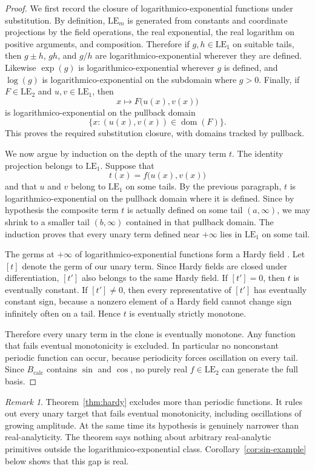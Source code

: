 \documentclass[11pt]{amsart}
\numberwithin{equation}{section}
\theoremstyle{remark}
\newtheorem{remark}[theorem]{Remark}
\theoremstyle{definition}
\newcommand{\LE}{\mathrm{LE}}
\newcommand{\calc}{B_{\mathrm{calc}}}
\begin{document}
\begin{proof}
We first record the closure of logarithmico-exponential functions under substitution. By definition, $\LE_m$ is generated from constants and coordinate projections by the field operations, the real exponential, the real logarithm on positive arguments, and composition. Therefore if $g,h\in \LE_1$ on suitable tails, then $g\pm h$, $gh$, and $g/h$ are logarithmico-exponential wherever they are defined. Likewise $\exp(g)$ is logarithmico-exponential wherever $g$ is defined, and $\log(g)$ is logarithmico-exponential on the subdomain where $g>0$. Finally, if $F\in \LE_2$ and $u,v\in \LE_1$, then
\[
x\longmapsto F\bigl(u(x),v(x)\bigr)
\]
is logarithmico-exponential on the pullback domain
\[
\{x:(u(x),v(x))\in \operatorname{dom}(F)\}.
\]
This proves the required substitution closure, with domains tracked by pullback.

We now argue by induction on the depth of the unary term $t$. The identity projection belongs to $\LE_1$. Suppose that
\[
t(x)=f\bigl(u(x),v(x)\bigr)
\]
and that $u$ and $v$ belong to $\LE_1$ on some tails. By the previous paragraph, $t$ is logarithmico-exponential on the pullback domain where it is defined. Since by hypothesis the composite term $t$ is actually defined on some tail $(a,\infty)$, we may shrink to a smaller tail $(b,\infty)$ contained in that pullback domain. The induction proves that every unary term defined near $+\infty$ lies in $\LE_1$ on some tail.

The germs at $+\infty$ of logarithmico-exponential functions form a Hardy field \cite{Rosenlicht1983,Aschenbrenner2017}. Let $[t]$ denote the germ of our unary term. Since Hardy fields are closed under differentiation, $[t']$ also belongs to the same Hardy field. If $[t']=0$, then $t$ is eventually constant. If $[t']\neq 0$, then every representative of $[t']$ has eventually constant sign, because a nonzero element of a Hardy field cannot change sign infinitely often on a tail. Hence $t$ is eventually strictly monotone.

Therefore every unary term in the clone is eventually monotone. Any function that fails eventual monotonicity is excluded. In particular no nonconstant periodic function can occur, because periodicity forces oscillation on every tail. Since $\calc$ contains $\sin$ and $\cos$, no purely real $f\in \LE_2$ can generate the full basis.
\end{proof}

\begin{remark}
Theorem~\ref{thm:hardy} excludes more than periodic functions. It rules out every unary target that fails eventual monotonicity, including oscillations of growing amplitude. At the same time its hypothesis is genuinely narrower than real-analyticity. The theorem says nothing about arbitrary real-analytic primitives outside the logarithmico-exponential class. Corollary~\ref{cor:sin-example} below shows that this gap is real.
\end{remark}
\end{document}
